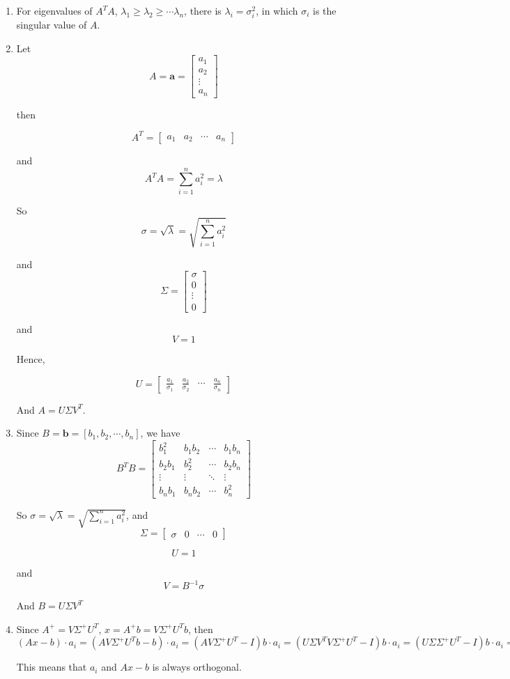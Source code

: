 \documentclass[11pt]{article}
\begin{document}
	\begin{enumerate}
		\item For eigenvalues of $A^TA$, $\lambda_1 \geq \lambda_2 \geq \cdots \lambda_n$, there is $\lambda_i = \sigma_i^2$, in which $\sigma_i$ is the singular value of $A$.
		\item Let 
			\[A = \mathbf{a} = \begin{bmatrix}
				a_1\\
				a_2\\
				\vdots\\
				a_n
			\end{bmatrix} \]
			
			then
			
			\[A^T = \begin{bmatrix}
				a_1 & a_2 & \cdots & a_n
			\end{bmatrix} \]
			
			and \[A^TA = \sum_{i = 1}^n a^2_i = \lambda\]
			
			So \[\sigma = \sqrt{\lambda} = \sqrt{\sum_{i = 1}^n a^2_i}\]
			
			and 
			\[\Sigma = \begin{bmatrix}
				\sigma \\
					0  \\
					\vdots\\
					0
			\end{bmatrix}	\]
			
			and 
				\[V = 1\]
				
			Hence,
			
			\[U = \begin{bmatrix}
				\frac{a_1}{\sigma_1} & \frac{a_2}{\sigma_2} & \cdots & \frac{a_n}{\sigma_n}
			\end{bmatrix}\]
			
			And $A = U\Sigma V^T$.
		\item Since $B = \mathbf{b} = [b_1, b_2, \cdots, b_n]$, we have 
		\[B^TB = \begin{bmatrix}
			b_1^2 & b_1b_2 & \cdots & b_1b_n\\
			b_2b_1 & b_2^2 & \cdots & b_2b_n\\
			\vdots & \vdots & \ddots & \vdots\\
			b_nb_1 & b_nb_2 & \cdots & b_n^2
		\end{bmatrix} \]
		
		So $\sigma = \sqrt{\lambda} = \sqrt{\sum_{i = 1}^n a^2_i}$, and
		\[\Sigma = \begin{bmatrix}
				\sigma &
					0  &
					\cdots&
					0
			\end{bmatrix}	\]
			
			\[U = 1\]
		
		and 
		\[V = B^{-1}\sigma\]
		
		And $B = U\Sigma V^T$
		\item
			Since $A^+ = V\Sigma^+U^T$, $x = A^+ b = V\Sigma^+U^Tb$, then $(Ax - b)\cdot a_i = (AV\Sigma^+U^Tb - b)\cdot a_i = (AV\Sigma^+U^T - I)b\cdot a_i = (U\Sigma V^TV\Sigma^+ U^T - I)b\cdot a_i = (U\Sigma \Sigma^+ U^T - I)b\cdot a_i = 0$
			
			This means that $a_i$ and $Ax - b$ is always orthogonal.
	\end{enumerate}
\end{document}
